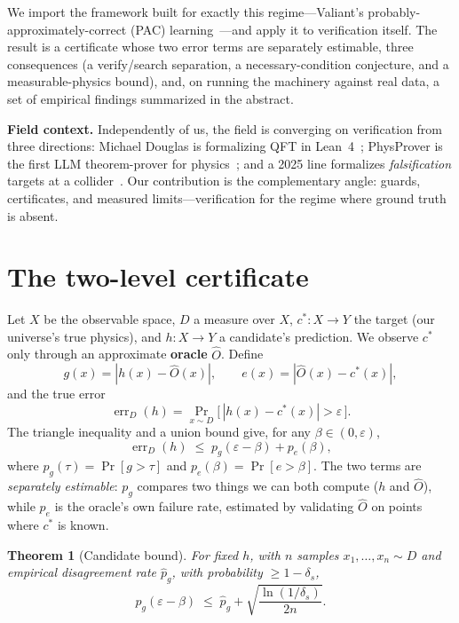 \documentclass[11pt]{article}
\newtheorem{theorem}{Theorem}
\newcommand{\cstar}{c^{*}}
\newcommand{\oracle}{\widehat{O}}
\newcommand{\eps}{\varepsilon}
\begin{document}
We import the framework built for exactly this regime---Valiant's
probably-approximately-correct (PAC) learning~\cite{valiant1984}---and apply it to
verification itself. The result is a certificate whose two error terms are separately
estimable, three consequences (a verify/search separation, a necessary-condition
conjecture, and a measurable-physics bound), and, on running the machinery against real
data, a set of empirical findings summarized in the abstract.

\textbf{Field context.} Independently of us, the field is converging on verification
from three directions: Michael Douglas is formalizing QFT in Lean~4~\cite{douglas_lean};
PhysProver is the first LLM theorem-prover for physics~\cite{physprover}; and a 2025 line
formalizes \emph{falsification} targets at a collider~\cite{falsify}. Our contribution
is the complementary angle: guards, certificates, and measured limits---verification
for the regime where ground truth is absent.

\section{The two-level certificate}
\label{sec:cert}

Let $X$ be the observable space, $D$ a measure over $X$, $\cstar : X \to Y$ the target
(our universe's true physics), and $h : X \to Y$ a candidate's prediction. We observe
$\cstar$ only through an approximate \textbf{oracle} $\oracle$. Define
\[
g(x) = |h(x) - \oracle(x)|, \qquad e(x) = |\oracle(x) - \cstar(x)|,
\]
and the true error
\[
\operatorname{err}_D(h) = \Pr_{x\sim D}\bigl[\, |h(x) - \cstar(x)| > \eps \,\bigr].
\]
The triangle inequality and a union bound give, for any $\beta \in (0, \eps)$,
\begin{equation}
\label{eq:split}
\operatorname{err}_D(h) \;\le\; p_g(\eps - \beta) + p_e(\beta),
\end{equation}
where $p_g(\tau)=\Pr[g>\tau]$ and $p_e(\beta)=\Pr[e>\beta]$. The two terms are
\emph{separately estimable}: $p_g$ compares two things we can both compute ($h$ and
$\oracle$), while $p_e$ is the oracle's own failure rate, estimated by validating
$\oracle$ on points where $\cstar$ is known.

\begin{theorem}[Candidate bound]
\label{thm:candidate}
For fixed $h$, with $n$ samples $x_1,\dots,x_n \sim D$ and empirical disagreement rate
$\hat p_g$, with probability $\ge 1-\delta_s$,
\[
p_g(\eps - \beta) \;\le\; \hat p_g + \sqrt{\frac{\ln(1/\delta_s)}{2n}} .
\]
\end{theorem}
\end{document}
